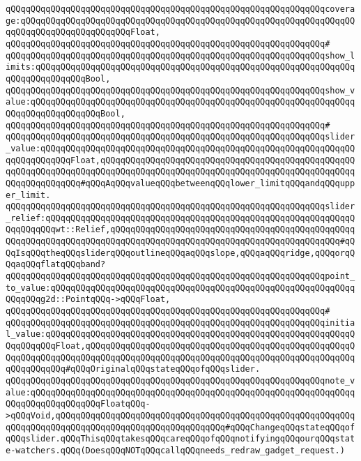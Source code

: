 \verb|qQQqqQQqqQQqqQQqqQQqqQQqqQQqqQQqqQQqqQQqqQQqqQQqqQQqqQQqqQQqqQQqcoverage:qQQqqQQqqQQqqQQqqQQqqQQqqQQqqQQqqQQqqQQqqQQqqQQqqQQqqQQqqQQqqQQqqQQqqQQqqQQqqQQqqQQqqQQqqQQqFloat,|\newline
\verb|qQQqqQQqqQQqqQQqqQQqqQQqqQQqqQQqqQQqqQQqqQQqqQQqqQQqqQQqqQQqqQQq#|\newline
\verb|qQQqqQQqqQQqqQQqqQQqqQQqqQQqqQQqqQQqqQQqqQQqqQQqqQQqqQQqqQQqqQQqshow_limits:qQQqqQQqqQQqqQQqqQQqqQQqqQQqqQQqqQQqqQQqqQQqqQQqqQQqqQQqqQQqqQQqqQQqqQQqqQQqqQQqBool,|\newline
\verb|qQQqqQQqqQQqqQQqqQQqqQQqqQQqqQQqqQQqqQQqqQQqqQQqqQQqqQQqqQQqqQQqshow_value:qQQqqQQqqQQqqQQqqQQqqQQqqQQqqQQqqQQqqQQqqQQqqQQqqQQqqQQqqQQqqQQqqQQqqQQqqQQqqQQqqQQqBool,|\newline
\verb|qQQqqQQqqQQqqQQqqQQqqQQqqQQqqQQqqQQqqQQqqQQqqQQqqQQqqQQqqQQqqQQq#|\newline
\verb|qQQqqQQqqQQqqQQqqQQqqQQqqQQqqQQqqQQqqQQqqQQqqQQqqQQqqQQqqQQqqQQqslider_value:qQQqqQQqqQQqqQQqqQQqqQQqqQQqqQQqqQQqqQQqqQQqqQQqqQQqqQQqqQQqqQQqqQQqqQQqqQQqFloat,qQQqqQQqqQQqqQQqqQQqqQQqqQQqqQQqqQQqqQQqqQQqqQQqqQQqqQQqqQQqqQQqqQQqqQQqqQQqqQQqqQQqqQQqqQQqqQQqqQQqqQQqqQQqqQQqqQQqqQQqqQQqqQQqqQQqqQQq#qQQqAqQQqvalueqQQqbetweenqQQqlower_limitqQQqandqQQqupper_limit.|\newline
\verb|qQQqqQQqqQQqqQQqqQQqqQQqqQQqqQQqqQQqqQQqqQQqqQQqqQQqqQQqqQQqqQQqslider_relief:qQQqqQQqqQQqqQQqqQQqqQQqqQQqqQQqqQQqqQQqqQQqqQQqqQQqqQQqqQQqqQQqqQQqqQQqwt::Relief,qQQqqQQqqQQqqQQqqQQqqQQqqQQqqQQqqQQqqQQqqQQqqQQqqQQqqQQqqQQqqQQqqQQqqQQqqQQqqQQqqQQqqQQqqQQqqQQqqQQqqQQqqQQqqQQqqQQq#qQQqIsqQQqtheqQQqsliderqQQqoutlineqQQqaqQQqslope,qQQqaqQQqridge,qQQqorqQQqaqQQqflatqQQqband?|\newline
\verb|qQQqqQQqqQQqqQQqqQQqqQQqqQQqqQQqqQQqqQQqqQQqqQQqqQQqqQQqqQQqqQQqpoint_to_value:qQQqqQQqqQQqqQQqqQQqqQQqqQQqqQQqqQQqqQQqqQQqqQQqqQQqqQQqqQQqqQQqqQQqg2d::PointqQQq->qQQqFloat,|\newline
\verb|qQQqqQQqqQQqqQQqqQQqqQQqqQQqqQQqqQQqqQQqqQQqqQQqqQQqqQQqqQQqqQQq#|\newline
\verb|qQQqqQQqqQQqqQQqqQQqqQQqqQQqqQQqqQQqqQQqqQQqqQQqqQQqqQQqqQQqqQQqinitial_value:qQQqqQQqqQQqqQQqqQQqqQQqqQQqqQQqqQQqqQQqqQQqqQQqqQQqqQQqqQQqqQQqqQQqqQQqFloat,qQQqqQQqqQQqqQQqqQQqqQQqqQQqqQQqqQQqqQQqqQQqqQQqqQQqqQQqqQQqqQQqqQQqqQQqqQQqqQQqqQQqqQQqqQQqqQQqqQQqqQQqqQQqqQQqqQQqqQQqqQQqqQQqqQQqqQQq#qQQqOriginalqQQqstateqQQqofqQQqslider.|\newline
\verb|qQQqqQQqqQQqqQQqqQQqqQQqqQQqqQQqqQQqqQQqqQQqqQQqqQQqqQQqqQQqqQQqnote_value:qQQqqQQqqQQqqQQqqQQqqQQqqQQqqQQqqQQqqQQqqQQqqQQqqQQqqQQqqQQqqQQqqQQqqQQqqQQqqQQqqQQqFloatqQQq->qQQqVoid,qQQqqQQqqQQqqQQqqQQqqQQqqQQqqQQqqQQqqQQqqQQqqQQqqQQqqQQqqQQqqQQqqQQqqQQqqQQqqQQqqQQqqQQqqQQqqQQqqQQqqQQq#qQQqChangeqQQqstateqQQqofqQQqslider.qQQqThisqQQqtakesqQQqcareqQQqofqQQqnotifyingqQQqourqQQqstate-watchers.qQQq(DoesqQQqNOTqQQqcallqQQqneeds_redraw_gadget_request.)|\newline
